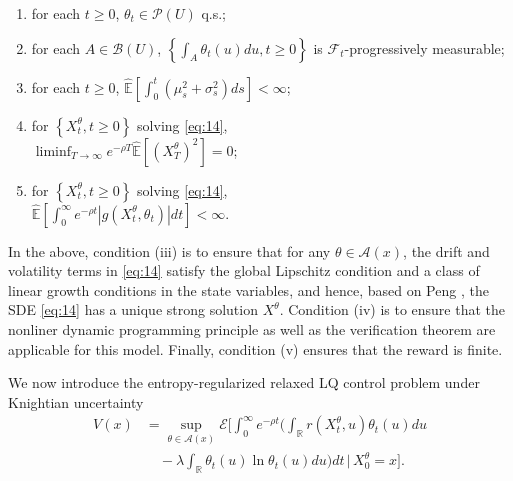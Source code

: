 \documentclass[onecolumn, journal]{IEEEtran} %
\begin{document}
	\begin{enumerate}
		\item[(i)] for each $t \geq 0$, $\theta_t \in \mathcal{P}(U)$ q.s.;
		
		\item[(ii)] for each $A \in \mathcal{B}(U)$, $\left\{ \int_A \theta_t(u)du, t \geq 0 \right\}$ is $\mathcal{F}_t$-progressively measurable;
		
		\item[(iii)]for each $t \geq 0$, $\hat{\mathbb{E}}\left[\int_0^t (\mu_s^2 + \sigma_s^2) ds\right] < \infty$;
		
		\item[(iv)]for $\left\{ X_t^\theta, t \geq 0 \right\}$ solving \eqref{eq:14}, \\$\liminf_{T \to \infty} e^{-\rho T} \hat{\mathbb{E}}\left[(X_T^\theta)^2\right] = 0$;
		
		\item[(v)] for $\left\{ X_t^\theta, t \geq 0 \right\}$ solving \eqref{eq:14}, \\$\hat{\mathbb{E}}\left[\int_0^\infty e^{-\rho t} |g(X_t^\theta, \theta_t)| dt\right] < \infty$.
	\end{enumerate}
	
	In the above, condition (iii) is to ensure that for any \(\theta \in \mathcal{A}(x)\), the drift and volatility terms in \eqref{eq:14} satisfy the global Lipschitz condition and a class of linear growth conditions in the state variables, and hence, based on Peng \cite{peng2010nonlinear}, the SDE \eqref{eq:14} has a unique strong solution \(X^\theta\). Condition (iv) is to ensure that the nonliner dynamic programming principle as well as the verification theorem are applicable for this model. Finally, condition (v) ensures that the reward is finite.
	
	We now introduce the entropy-regularized relaxed LQ control problem under Knightian uncertainty
	\begin{equation}\label{eq:15}
		\begin{split}
			V(x) &= \sup_{\theta \in \mathcal{A}(x)} \mathcal{E}\bigg[\int_0^\infty e^{-\rho t}\Big(\int_{\mathbb{R}} r(X_t^\theta, u)\theta_t(u)du \\
			&\quad-\lambda\int_{\mathbb{R}}\theta_t(u)\ln\theta_t(u)du\Big)dt\,\bigg|\,X_0^\theta = x\bigg].
		\end{split}
		\tag{15}
	\end{equation}
	
\end{document}

